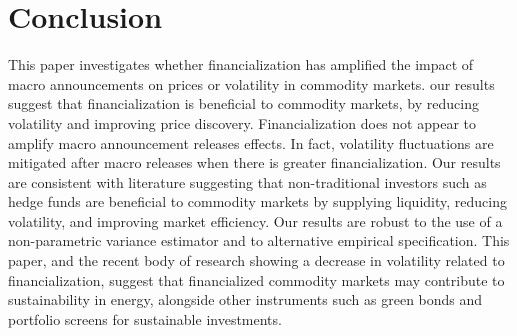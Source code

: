 \documentclass[12pt]{article}
\begin{document}

\section{Conclusion} \label{sec:conclusion}
 This paper investigates whether financialization has amplified the impact of macro announcements on prices or volatility in commodity markets. our results suggest that financialization is beneficial to commodity markets, by reducing volatility and improving price discovery. Financialization does not appear to amplify macro announcement releases effects. In fact, volatility fluctuations are mitigated after macro releases when there is greater financialization. Our results are consistent with literature suggesting that non-traditional investors such as hedge funds are beneficial to commodity markets by supplying liquidity, reducing volatility, and improving market efficiency. Our results are robust to the use of a non-parametric variance estimator and to alternative empirical specification.
This paper, and the recent body of research showing a decrease in volatility related to financialization, suggest that financialized commodity markets may contribute to sustainability in energy, alongside other instruments such as green bonds and portfolio screens for sustainable investments.

\newpage




\end{document}
